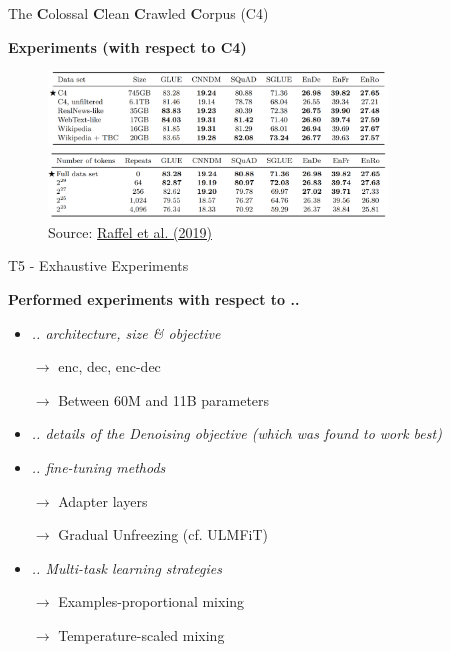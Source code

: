 \begin{frame}{The \textbf{C}olossal \textbf{C}lean \textbf{C}rawled \textbf{C}orpus (C4)}

\vfill
	
	\textbf{Experiments (with respect to C4)}
	
	\begin{figure}
		\centering
		\includegraphics[width = 9cm]{figure/c4-characteristics.png}\\ 
		\includegraphics[width = 9cm]{figure/c4-size.png}\\ 
		\footnotesize{Source:} \href{https://arxiv.org/pdf/1910.10683.pdf}{\footnotesize Raffel et al. (2019)}
	\end{figure}
	
\vfill

\end{frame}


\begin{frame}{T5 - Exhaustive Experiments}

\vfill

	\textbf{Performed experiments with respect to ..}
	
	\begin{itemize}
		\item \textit{.. architecture, size \& objective}
		\item[$\to$] enc, dec, enc-dec
		\item[$\to$] Between 60M and 11B parameters
		\item \textit{.. details of the Denoising objective (which was found to work best)}
		\item \textit{.. fine-tuning methods}
		\item[$\to$] Adapter layers
		\item[$\to$] Gradual Unfreezing (cf. ULMFiT)
		\item \textit{.. Multi-task learning strategies}
		\item[$\to$] Examples-proportional mixing
		\item[$\to$] Temperature-scaled mixing
	\end{itemize}
	
\vfill

\end{frame}


